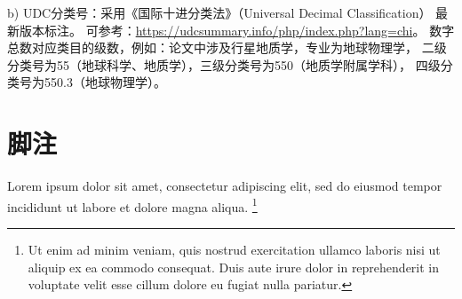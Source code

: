 b) UDC分类号：采用《国际十进分类法》（Universal Decimal
Classification） 最新版本标注。
可参考：\url{https://udcsummary.info/php/index.php?lang=chi}。
数字总数对应类目的级数，例如：论文中涉及行星地质学，专业为地球物理学，
二级分类号为55（地球科学、地质学），三级分类号为550（地质学附属学科），
四级分类号为550.3（地球物理学）。



\section{脚注}

Lorem ipsum dolor sit amet, consectetur adipiscing elit, sed do eiusmod tempor
incididunt ut labore et dolore magna aliqua.
\footnote{Ut enim ad minim veniam, quis nostrud exercitation ullamco laboris
  nisi ut aliquip ex ea commodo consequat.
  Duis aute irure dolor in reprehenderit in voluptate velit esse cillum dolore
  eu fugiat nulla pariatur.}
